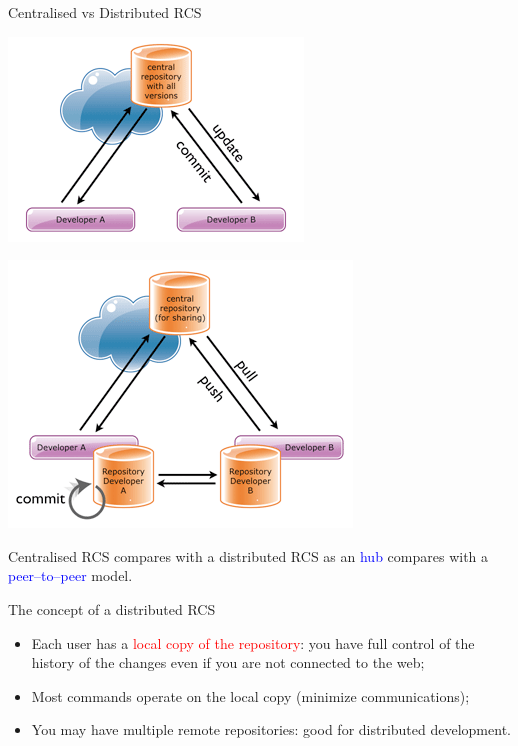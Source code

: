 \documentclass[hyperref={colorlinks}]{beamer}
\begin{document}
\begin{frame}{Centralised vs Distributed RCS}
\begin{minipage}{0.45\textwidth}
\includegraphics[width=\textwidth]{figures/centralised}
\end{minipage}
\hfill
\begin{minipage}{0.45\textwidth}
\includegraphics[width=\textwidth]{figures/distributed}
\end{minipage}
\medskip

Centralised RCS compares with a distributed RCS as an \textcolor{blue}{hub} compares with a \textcolor{blue}{peer--to--peer} model.
\end{frame}
\begin{frame}{The concept of a distributed RCS}
\begin{itemize}
\item Each user has a \textcolor{red}{local copy of the repository}: you have full control of the history of the changes even if you are not connected to the web;
\item Most commands \alert{operate on the local copy} (minimize communications);
\item You may have \alert{multiple remote repositories}: good for distributed development.
\end{itemize}
\end{frame}
\end{document}
